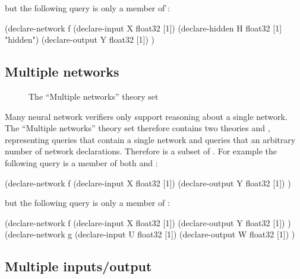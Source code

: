 but the following query is only a member of \h{}:

\begin{code}[style=lbnf]
(declare-network f
    (declare-input  X float32 [1])
    (declare-hidden H float32 [1] "hidden")
    (declare-output Y float32 [1])
)
\end{code}

\subsection{Multiple networks}
\label{sec:multiple-networks}

\begin{figure}[h]
\centering
{}
\caption{The ``Multiple networks'' theory set}
\label{fig:multiple-networks-theory-set}
\end{figure}

Many neural network verifiers only support reasoning about a single network. The ``Multiple networks'' theory set therefore contains two theories \snet{} and \mnet{}, representing queries that contain a single network and queries that an arbitrary number of network declarations. Therefore \snet{} is a subset of \mnet{}. For example the following query is a member of both \snet{} and \mnet{}:

\begin{code}[style=lbnf]
(declare-network f
    (declare-input  X float32 [1])
    (declare-output Y float32 [1])
)
\end{code}

but the following query is only a member of \mnet{}:

\begin{code}[style=lbnf]
(declare-network f
    (declare-input  X float32 [1])
    (declare-output Y float32 [1])
)
(declare-network g
    (declare-input  U float32 [1])
    (declare-output W float32 [1])
)
\end{code}

\subsection{Multiple inputs/output}
\label{sec:multiple-inputs-outputs}

